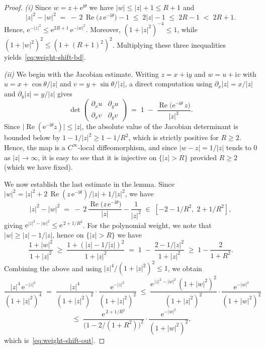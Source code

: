 \documentclass[11pt]{amsart}
\theoremstyle{remark}
\newcommand{\abs}[1]{\lvert #1 \rvert}
\newcommand{\ee}{\mathrm{e}}
\newcommand{\ii}{\mathrm{i}}
\begin{document}
\begin{proof}
\emph{(i)}\;
Since $w = z+\ee^{\ii\theta}$ we have $\abs{w}\le \abs{z}+1\le R+1$ and
\[
\abs{z}^{2} - \abs{w}^{2}
\;=\; -\,2\,\operatorname{Re}\!\bigl(z\,\ee^{-\ii\theta}\bigr) - 1
\;\le\; 2\abs{z} - 1
\;\le\; 2R - 1
\;<\; 2R + 1.
\]
Hence,
$\ee^{-\abs{z}^{2}} \le \ee^{2R+1}\,\ee^{-\abs{w}^{2}}$. Moreover,
$(1+\abs{z}^{2})^{-4} \le 1$, while $(1+\abs{w}^{2})^{2} \le
(1+(R+1)^{2})^{2}$. Multiplying these three inequalities
yields~\eqref{eq:weight-shift-bd}.

\medskip

\emph{(ii)}\; We begin with the Jacobian estimate.
Writing $z = x+\ii y$ and $w = u + \ii v$ with $u = x +
\cos\theta/\abs{z}$ and $v = y + \sin\theta/\abs{z}$, a direct
computation using $\partial_{x}\abs{z} = x/\abs{z}$ and
$\partial_{y}\abs{z} = y/\abs{z}$ gives
\[
\det\!\begin{pmatrix} \partial_{x} u & \partial_{y} u \\
\partial_{x} v & \partial_{y} v \end{pmatrix}
\;=\;
1 \;-\; \frac{\operatorname{Re}\bigl(\ee^{-\ii\theta}\,z\bigr)}{\abs{z}^{3}}.
\]
Since $\abs{\operatorname{Re}(\ee^{-\ii\theta}z)} \le \abs{z}$, the
absolute value of the Jacobian determinant is bounded below by
$1 - 1/\abs{z}^{2} \ge 1 - 1/R^{2}$, which is strictly positive for
$R\ge 2$. Hence, the map is a $C^{\infty}$-local diffeomorphism, and
since $\abs{w-z} = 1/\abs{z}$ tends to $0$ as $\abs{z}\to\infty$, it is
easy to see that it is injective on $\{\abs{z}>R\}$ provided $R \ge 2$ (which we have
fixed).
\medskip

We now establish the last estimate in the lemma.
Since $\abs{w}^{2} = \abs{z}^{2} +
2\,\operatorname{Re}(z\,\ee^{-\ii\theta})/\abs{z} + 1/\abs{z}^{2}$, we have
\[
\abs{z}^{2} - \abs{w}^{2}
\;=\; -\,2\,\frac{\operatorname{Re}\bigl(z\,\ee^{-\ii\theta}\bigr)}{\abs{z}}
- \frac{1}{\abs{z}^{2}}
\;\in\; [-2 - 1/R^{2},\; 2 + 1/R^{2}],
\]
giving $\ee^{\abs{z}^{2}-\abs{w}^{2}} \le \ee^{\,2 + 1/R^{2}}$.
For the polynomial weight, we note that $\abs{w}\ge \abs{z} - 1/\abs{z}$, hence on
$\{\abs{z} > R\}$ we have
\[
\frac{1+\abs{w}^{2}}{1+\abs{z}^{2}}
\;\ge\;
\frac{1+(\abs{z}-1/\abs{z})^{2}}{1+\abs{z}^{2}}
\;=\;
1 \;-\; \frac{2 - 1/\abs{z}^{2}}{1+\abs{z}^{2}}
\;\ge\;
1 - \frac{2}{1+R^{2}}.
\]
Combining the above and using $\abs{z}^{4}/(1+\abs{z}^{2})^{2} \le 1$, we obtain
\[
\frac{\abs{z}^{4}\,\ee^{-\abs{z}^{2}}}{(1+\abs{z}^{2})^{4}}
\;=\;
\frac{\abs{z}^{4}}{(1+\abs{z}^{2})^{2}}\cdot
\frac{\ee^{-\abs{z}^{2}}}{(1+\abs{z}^{2})^{2}}
\;\le\;
\frac{\ee^{\,\abs{z}^{2}-\abs{w}^{2}}\,(1+\abs{w}^{2})^{2}}
{(1+\abs{z}^{2})^{2}}\cdot
\frac{\ee^{-\abs{w}^{2}}}{(1+\abs{w}^{2})^{2}} \]
\[
\;\le\;
\frac{\ee^{\,2 + 1/R^{2}}}{\bigl(1-2/(1+R^{2})\bigr)^{2}}\cdot
\frac{\ee^{-\abs{w}^{2}}}{(1+\abs{w}^{2})^{2}},
\]
which is~\eqref{eq:weight-shift-out}.
\end{proof}
\end{document}
